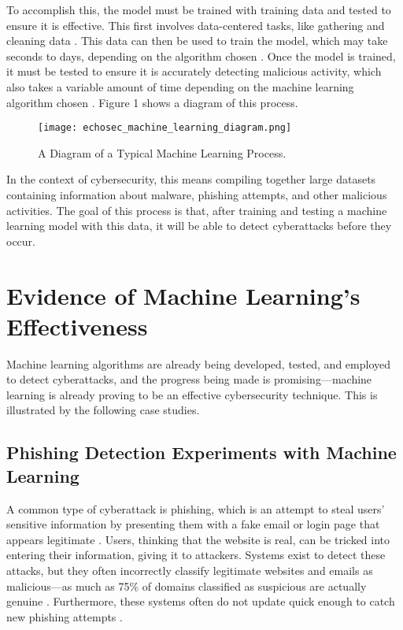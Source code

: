 To accomplish this, the model must be trained with training data and tested to ensure it is effective.
This first involves data-centered tasks, like gathering and cleaning data \cite{sarker_kayes_badsha_2020}.
This data can then be used to train the model, which may take seconds to days, depending on the algorithm chosen \cite{xin2018}.
Once the model is trained, it must be tested to ensure it is accurately detecting malicious activity, which also takes a variable amount of time depending on the machine learning algorithm chosen \cite{xin2018}.
Figure 1 shows a diagram of this process.

\begin{figure}[H]
    \centering
    \texttt{[image: echosec\_machine\_learning\_diagram.png]}
    \caption[Diagram of Machine Learning Process]{A Diagram of a Typical Machine Learning Process. \cite{echosec}}
\end{figure}

In the context of cybersecurity, this means compiling together large datasets containing information about malware, phishing attempts, and other malicious activities.
The goal of this process is that, after training and testing a machine learning model with this data, it will be able to detect cyberattacks before they occur.

\section{Evidence of Machine Learning's Effectiveness}
Machine learning algorithms are already being developed, tested, and employed to detect cyberattacks, and the progress being made is promising---machine learning is already proving to be an effective cybersecurity technique.
This is illustrated by the following case studies.

\subsection{Phishing Detection Experiments with Machine Learning}
A common type of cyberattack is phishing, which is an attempt to steal users' sensitive information by presenting them with a fake email or login page that appears legitimate \cite{anti_phishing_techniques}.
Users, thinking that the website is real, can be tricked into entering their information, giving it to attackers.
Systems exist to detect these attacks, but they often incorrectly classify legitimate websites and emails as malicious---as much as 75\% of domains classified as suspicious are actually genuine \cite{anti_phishing_techniques}.
Furthermore, these systems often do not update quick enough to catch new phishing attempts \cite{anti_phishing_techniques}.

